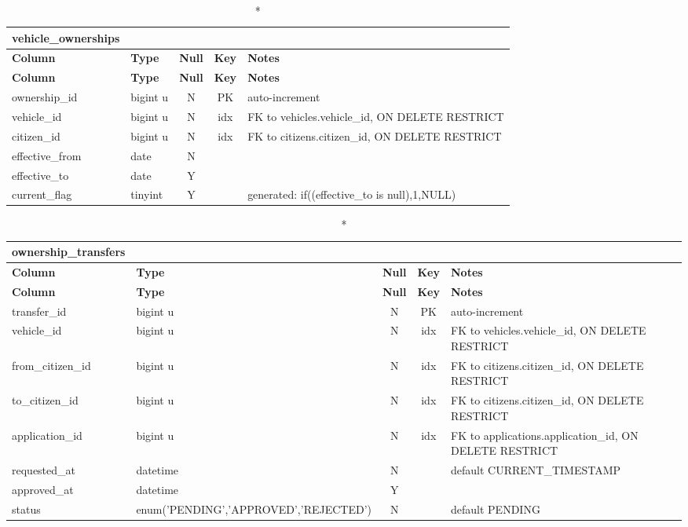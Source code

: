 \begin{longtable}{@{}p{3.4cm}p{2.9cm}c c p{5.6cm}@{}}
\caption*{\textbf{vehicle\_\allowbreak{}ownerships}}\\
\toprule \textbf{Column} & \textbf{Type} & \textbf{Null} & \textbf{Key} & \textbf{Notes} \\ \midrule \endfirsthead
\toprule \textbf{Column} & \textbf{Type} & \textbf{Null} & \textbf{Key} & \textbf{Notes} \\ \midrule \endhead
\bottomrule \endlastfoot
ownership\_\allowbreak{}id & bigint u & N & PK & auto-increment \\
vehicle\_\allowbreak{}id & bigint u & N & idx & FK to vehicles.vehicle\_\allowbreak{}id, ON DELETE RESTRICT \\
citizen\_\allowbreak{}id & bigint u & N & idx & FK to citizens.citizen\_\allowbreak{}id, ON DELETE RESTRICT \\
effective\_\allowbreak{}from & date & N &  &  \\
effective\_\allowbreak{}to & date & Y &  &  \\
current\_\allowbreak{}flag & tinyint & Y &  & generated: if((effective\_\allowbreak{}to is null),1,NULL) \\
\end{longtable}
\vspace{-0.4em}
\begin{longtable}{@{}p{3.4cm}p{2.9cm}c c p{5.6cm}@{}}
\caption*{\textbf{ownership\_\allowbreak{}transfers}}\\
\toprule \textbf{Column} & \textbf{Type} & \textbf{Null} & \textbf{Key} & \textbf{Notes} \\ \midrule \endfirsthead
\toprule \textbf{Column} & \textbf{Type} & \textbf{Null} & \textbf{Key} & \textbf{Notes} \\ \midrule \endhead
\bottomrule \endlastfoot
transfer\_\allowbreak{}id & bigint u & N & PK & auto-increment \\
vehicle\_\allowbreak{}id & bigint u & N & idx & FK to vehicles.vehicle\_\allowbreak{}id, ON DELETE RESTRICT \\
from\_\allowbreak{}citizen\_\allowbreak{}id & bigint u & N & idx & FK to citizens.citizen\_\allowbreak{}id, ON DELETE RESTRICT \\
to\_\allowbreak{}citizen\_\allowbreak{}id & bigint u & N & idx & FK to citizens.citizen\_\allowbreak{}id, ON DELETE RESTRICT \\
application\_\allowbreak{}id & bigint u & N & idx & FK to applications.application\_\allowbreak{}id, ON DELETE RESTRICT \\
requested\_\allowbreak{}at & datetime & N &  & default CURRENT\_\allowbreak{}TIMESTAMP \\
approved\_\allowbreak{}at & datetime & Y &  &  \\
status & enum('PENDING',\allowbreak{}'APPROVED',\allowbreak{}'REJECTED') & N &  & default PENDING \\
\end{longtable}
\vspace{-0.4em}
